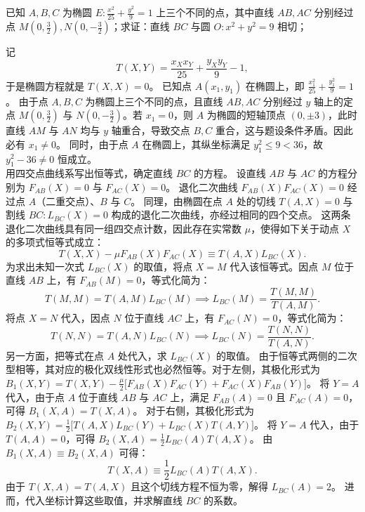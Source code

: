 \begin{example}
已知 \(A,B,C\) 为椭圆 \(E: \frac{x^2}{25} + \frac{y^2}{9} = 1\) 上三个不同的点，其中直线 \(AB,AC\) 分别经过点 \(M\left(0,\frac{3}{2}\right),N\left(0,-\frac{3}{2}\right)\)；求证：直线 \(BC\) 与圆 \(O: x^2 + y^2 = 9\) 相切；
\end{example}
\begin{solution}
记
\[ T(X, Y) = \frac{x_X x_Y}{25} + \frac{y_X y_Y}{9} - 1, \]
于是椭圆方程就是 $T(X, X) = 0$。
已知点 $A(x_1, y_1)$ 在椭圆上，即 $\frac{x_1^2}{25} + \frac{y_1^2}{9} = 1$。
由于点 $A, B, C$ 为椭圆上三个不同的点，且直线 $AB, AC$ 分别经过 $y$ 轴上的定点 $M\left(0, \frac{3}{2}\right)$ 与 $N\left(0, -\frac{3}{2}\right)$。若 $x_1 = 0$，则 $A$ 为椭圆的短轴顶点 $(0, \pm 3)$，此时直线 $AM$ 与 $AN$ 均与 $y$ 轴重合，导致交点 $B, C$ 重合，这与题设条件矛盾。因此必有 $x_1 \neq 0$。
同时，由于点 $A$ 在椭圆上，其纵坐标满足 $y_1^2 \le 9 < 36$，故 $y_1^2 - 36 \neq 0$ 恒成立。\\
用四交点曲线系写出恒等式，确定直线 $BC$ 的方程。
设直线 $AB$ 与 $AC$ 的方程分别为 $F_{AB}(X) = 0$ 与 $F_{AC}(X) = 0$。
退化二次曲线 $F_{AB}(X)F_{AC}(X) = 0$ 经过点 $A$（二重交点）、$B$ 与 $C$。
同理，由椭圆在点 $A$ 处的切线 $T(A, X) = 0$ 与割线 $BC: L_{BC}(X) = 0$ 构成的退化二次曲线，亦经过相同的四个交点。
这两条退化二次曲线具有同一组四交点计数，因此存在实常数 $\mu$，使得如下关于动点 $X$ 的多项式恒等式成立：
\[ T(X, X) - \mu F_{AB}(X) F_{AC}(X) \equiv T(A, X) L_{BC}(X). \]
为求出未知一次式 $L_{BC}(X)$ 的取值，将点 $X = M$ 代入该恒等式。因点 $M$ 位于直线 $AB$ 上，有 $F_{AB}(M) = 0$，等式化简为：
\[ T(M, M) = T(A, M) L_{BC}(M) \implies L_{BC}(M) = \frac{T(M, M)}{T(A, M)}. \]
将点 $X = N$ 代入，因点 $N$ 位于直线 $AC$ 上，有 $F_{AC}(N) = 0$，等式化简为：
\[ T(N, N) = T(A, N) L_{BC}(N) \implies L_{BC}(N) = \frac{T(N, N)}{T(A, N)}. \]
另一方面，把等式在点 $A$ 处代入，求 $L_{BC}(X)$ 的取值。
由于恒等式两侧的二次型相等，其对应的极化双线性形式也必然恒等。对于左侧，其极化形式为 $B_1(X, Y) = T(X, Y) - \frac{\mu}{2} \big[ F_{AB}(X) F_{AC}(Y) + F_{AC}(X) F_{AB}(Y) \big]$。
将 $Y = A$ 代入，由于点 $A$ 位于直线 $AB$ 与 $AC$ 上，满足 $F_{AB}(A) = 0$ 且 $F_{AC}(A) = 0$，可得 $B_1(X, A) = T(X, A)$。
对于右侧，其极化形式为 $B_2(X, Y) = \frac{1}{2} \big[ T(A, X) L_{BC}(Y) + L_{BC}(X) T(A, Y) \big]$。
将 $Y = A$ 代入，由于 $T(A, A) = 0$，可得 $B_2(X, A) = \frac{1}{2} L_{BC}(A) T(A, X)$。
由 $B_1(X, A) \equiv B_2(X, A)$ 可得：
\[ T(X, A) \equiv \frac{1}{2} L_{BC}(A) T(A, X). \]
由于 $T(X, A) = T(A, X)$ 且这个切线方程不恒为零，解得 $L_{BC}(A) = 2$。
进而，代入坐标计算这些取值，并求解直线 $BC$ 的系数。

\end{solution}
